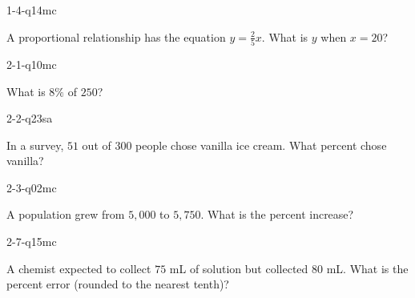 
\begin{practiceQuestion}{1-4-q14}{mc}
\begin{questionText}
A proportional relationship has the equation $y = \frac{2}{5}x$. What is $y$ when $x = 20$?
\end{questionText}
\end{practiceQuestion}

\begin{practiceQuestion}{2-1-q10}{mc}
\begin{questionText}
What is $8\%$ of $250$?
\end{questionText}
\end{practiceQuestion}

\begin{practiceQuestion}{2-2-q23}{sa}
\begin{questionText}
In a survey, $51$ out of $300$ people chose vanilla ice cream. What percent chose vanilla?
\end{questionText}
\end{practiceQuestion}

\begin{practiceQuestion}{2-3-q02}{mc}
\begin{questionText}
A population grew from $5{,}000$ to $5{,}750$. What is the percent increase?
\end{questionText}
\end{practiceQuestion}

\begin{practiceQuestion}{2-7-q15}{mc}
\begin{questionText}
A chemist expected to collect $75$ mL of solution but collected $80$ mL. What is the percent error (rounded to the nearest tenth)?
\end{questionText}
\end{practiceQuestion}

